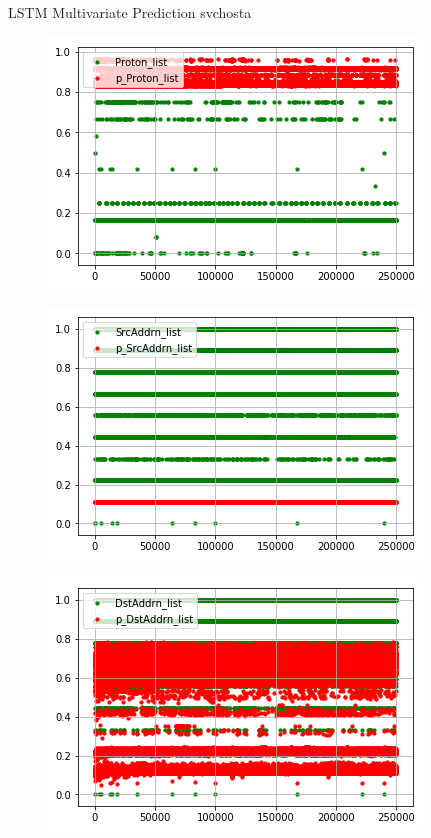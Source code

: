 \documentclass[t]{beamer}
\begin{document}
\begin{frame}{LSTM Multivariate Prediction svchosta}
    \begin{subfigure}[b]{0.3\linewidth}
        \includegraphics[width=\textwidth]{public/assets/img/lstmm_svchosta_pred1.png}
    \end{subfigure}
    \begin{subfigure}[b]{0.3\linewidth}
        \includegraphics[width=\textwidth]{public/assets/img/lstmm_svchosta_pred2.png}
    \end{subfigure}
       \begin{subfigure}[b]{0.3\linewidth}
        \includegraphics[width=\textwidth]{public/assets/img/lstmm_svchosta_pred3.png}

\end{subfigure}
\end{frame}
\end{document}
